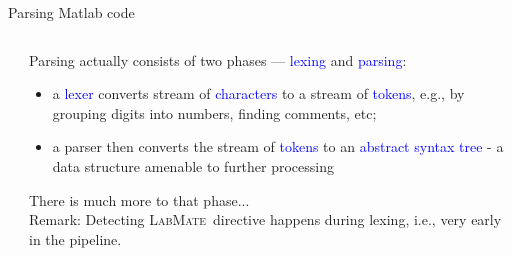 \documentclass[handout]{beamer}
\newcommand{\keyword}[1]{\textcolor{blue}{#1}}
\newcommand{\lr}{\textsc{LabMate}}
\begin{document}
\begin{frame}{Parsing Matlab code}
  \begin{columns}
  \begin{column}{0.3\textwidth}
  \end{column}
  \begin{column}{0.55\textwidth}
  Parsing actually consists of two phases --- \keyword{lexing} and \keyword{parsing}:
  \begin{itemize}
    \item a \keyword{lexer} converts stream of \keyword{characters} to a stream of \keyword{tokens}, e.g., by grouping digits into numbers, finding comments, etc;
    \item a parser then converts the stream of \keyword{tokens} to an \keyword{abstract syntax tree} - a data structure amenable to further processing
  \end{itemize}
  There is much more to that phase...\\
  Remark: Detecting \lr\ directive happens during lexing, i.e., very early in the pipeline.
  \end{column}
  \end{columns}
\end{frame}
\end{document}
